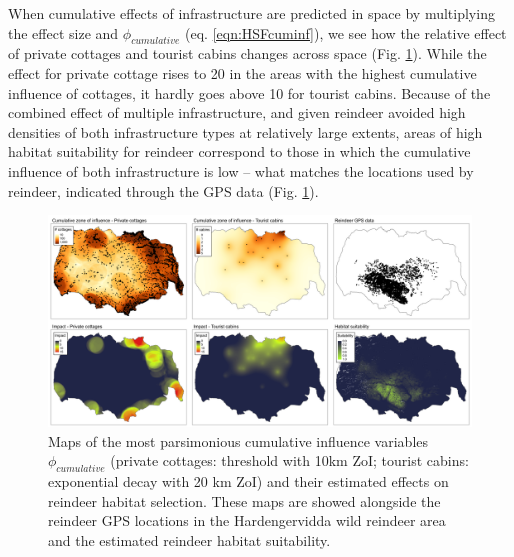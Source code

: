 \documentclass[titlepage]{article}
\begin{document}
When cumulative effects of infrastructure are predicted in space by multiplying the effect size and $\phi_{cumulative}$ (eq. \ref{eqn:HSFcuminf}), we see how the relative effect of private cottages and tourist cabins changes across space (Fig. \ref{fig:prediction_maps}). While the effect for private cottage rises to 20 in the areas with the highest cumulative influence of cottages, it hardly goes above 10 for tourist cabins. Because of the combined effect of multiple infrastructure, and given reindeer
avoided high densities of both infrastructure types at relatively large extents, 
areas of high habitat suitability for reindeer correspond to those in which the
cumulative influence of both infrastructure is low -- what matches the
locations used by reindeer, indicated through the GPS data (Fig. \ref{fig:prediction_maps}).

\begin{figure}[h]
\centering
\includegraphics[width=1.3\textwidth,center]{figures/reindeer_results_prediction_maps.png}
\caption{\label{fig:prediction_maps} Maps of the most parsimonious cumulative influence variables $\phi_{cumulative}$ (private cottages: threshold with 10km ZoI; tourist cabins: exponential decay with 20 km ZoI) and their estimated effects on reindeer habitat selection. These maps are showed alongside the reindeer GPS locations in the Hardengervidda wild reindeer area and the estimated reindeer habitat suitability.}
\end{figure}

\end{document}
